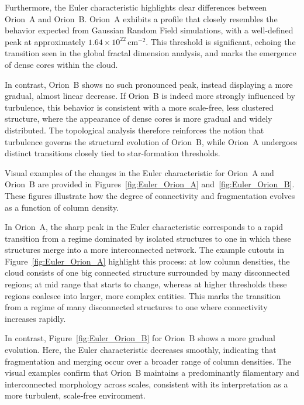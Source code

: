 Furthermore, the Euler characteristic highlights clear differences between Orion~A and Orion~B.  
Orion~A exhibits a profile that closely resembles the behavior expected from Gaussian Random Field simulations, with a well-defined peak at approximately \(1.64 \times 10^{22}\,\mathrm{cm}^{-2}\).  
This threshold is significant, echoing the transition seen in the global fractal dimension analysis, and marks the emergence of dense cores within the cloud.

In contrast, Orion~B shows no such pronounced peak, instead displaying a more gradual, almost linear decrease.  
If Orion~B is indeed more strongly influenced by turbulence, this behavior is consistent with a more scale-free, less clustered structure, where the appearance of dense cores is more gradual and widely distributed.  
The topological analysis therefore reinforces the notion that turbulence governs the structural evolution of Orion~B, while Orion~A undergoes distinct transitions closely tied to star-formation thresholds.

Visual examples of the changes in the Euler characteristic for Orion~A and Orion~B are provided in Figures~\ref{fig:Euler_Orion_A} and~\ref{fig:Euler_Orion_B}.  
These figures illustrate how the degree of connectivity and fragmentation evolves as a function of column density.  

In Orion~A, the sharp peak in the Euler characteristic corresponds to a rapid transition from a regime dominated by isolated structures to one in which these structures merge into a more interconnected network.  
The example cutouts in Figure~\ref{fig:Euler_Orion_A} highlight this process: at low column densities, the cloud consists of one big connected structure surrounded by many disconnected regions; at mid range that starts to change, whereas at higher thresholds these regions coalesce into larger, more complex entities.
This marks the transition from a regime of many disconnected structures to one where connectivity increases rapidly.

In contrast, Figure~\ref{fig:Euler_Orion_B} for Orion~B shows a more gradual evolution.  
Here, the Euler characteristic decreases smoothly, indicating that fragmentation and merging occur over a broader range of column densities.  
The visual examples confirm that Orion~B maintains a predominantly filamentary and interconnected morphology across scales, consistent with its interpretation as a more turbulent, scale‑free environment.

